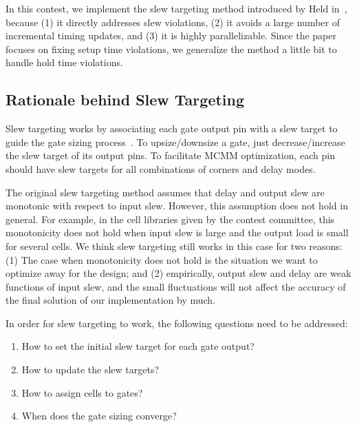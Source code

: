 In this contest, we implement the slew targeting method introduced by Held in~\cite{Held:Gate}, because (1) it directly addresses slew violations, (2) it avoids a large number of incremental timing updates, and (3) it is highly parallelizable. Since the paper focuses on fixing setup time violations, we generalize the method a little bit to handle hold time violations.


\subsection{Rationale behind Slew Targeting}

Slew targeting works by associating each gate output pin with a slew target to guide the gate sizing process~\cite{Held:Gate}. To upsize/downsize a gate, just decrease/increase the slew target of its output pins. To facilitate MCMM optimization, each pin should have slew targets for all combinations of corners and delay modes.

The original slew targeting method assumes that delay and output slew are monotonic with respect to input slew. However, this assumption does not hold in general. For example, in the cell libraries given by the contest committee, this monotonicity does not hold when input slew is large and the output load is small for several cells. We think slew targeting still works in this case for two reasons: (1) The case when monotonicity does not hold is the situation we want to optimize away for the design; and (2) empirically, output slew and delay are weak functions of input slew, and the small fluctuations will not affect the accuracy of the final solution of our implementation by much.

In order for slew targeting to work, the following questions need to be addressed:
\begin{enumerate}
\item How to set the initial slew target for each gate output?
\item How to update the slew targets?
\item How to assign cells to gates?
\item When does the gate sizing converge?
\end{enumerate}

